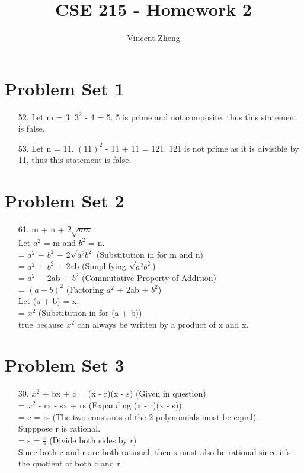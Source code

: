 \documentclass[12pt]{article}
\author{Vincent Zheng}
\begin{document}
\title{CSE 215 - Homework 2}
\maketitle

\section*{Problem Set 1}
\begin{itemize}
    \item [52.]
        Let m = 3. $3^2$ - 4 = 5. 5 is prime and not composite, thus this statement is
        false.
    \item [53.]
        Let n = 11. $(11)^2$ - 11 + 11 = 121. 121 is not prime as it is divisible by 11,
        thus this statement is false.
\end{itemize}

\section*{Problem Set 2}
\begin{itemize}
    \item [61.]
        m + n + 2$\sqrt{mn}$ \\
        Let $a^2$ = m and $b^2$ = n. \\
        = $a^2$ + $b^2$ + 2$\sqrt{a^2 b^2}$ (Substitution in for m and n)\\
        = $a^2$ + $b^2$ + 2ab (Simplifying $\sqrt{a^2 b^2}$) \\
        = $a^2$ + 2ab + $b^2$ (Commutative Property of Addition) \\
        = $(a + b)^2$ (Factoring $a^2$ + 2ab + $b^2$) \\
        Let (a + b) = x. \\
        = $x^2$ (Substitution in for (a + b)) \\
        true because $x^2$ can always be written by a product of x and x.
\end{itemize}

\section*{Problem Set 3}
\begin{itemize}
    \item [30.]
        $x^2$ + bx + c = (x - r)(x - s) (Given in question) \\
        = $x^2$ - rx - sx + rs (Expanding (x - r)(x - s)) \\
        = c = rs (The two constants of the 2 polynomials must be equal). \\
        Supppose r is rational. \\
        = s = $\frac{c}{r}$ (Divide both sides by r) \\
        Since both c and r are both rational, then s must also be rational since it's
        the quotient of both c and r.
\end{itemize}
\end{document}
